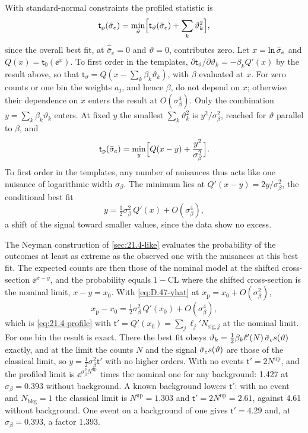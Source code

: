 With standard-normal constraints the profiled statistic is
\begin{equation*}
  \mathsf{t}_{\mathrm{p}}(\bar{\sigma}_{e}) = \min_\vartheta\Bigl[\mathsf{t}_\vartheta(\bar{\sigma}_{e}) + \sum_k\vartheta_k^2\Bigr] ,
\end{equation*}
since the overall best fit, at $\hat{\bar\sigma}_e = 0$ and $\vartheta = 0$, contributes zero. Let $x = \ln\bar{\sigma}_{e}$ and $Q(x) = \mathsf{t}_0(\ee^x)$. To first order in the templates, $\partial\mathsf{t}_\vartheta/\partial\vartheta_k = -\beta_kQ'(x)$ by the result above, so that $\mathsf{t}_\vartheta = Q(x - \sum_k\beta_k\vartheta_k)$, with $\beta$ evaluated at $x$. For zero counts or one bin the weights $a_j$, and hence $\beta$, do not depend on $x$; otherwise their dependence on $x$ enters the result at $O(\sigma_\beta^4)$. Only the combination $y = \sum_k\beta_k\vartheta_k$ enters. At fixed $y$ the smallest $\sum_k\vartheta_k^2$ is $y^2/\sigma_\beta^2$, reached for $\vartheta$ parallel to $\beta$, and
\begin{equation*}
  \mathsf{t}_{\mathrm{p}}(\bar{\sigma}_{e}) = \min_y\Bigl[Q(x - y) + \frac{y^2}{\sigma_\beta^2}\Bigr] .
\end{equation*}
To first order in the templates, any number of nuisances thus acts like one nuisance of logarithmic width $\sigma_\beta$. The minimum lies at $Q'(x - y) = 2y/\sigma_\beta^2$, the conditional best fit
\begin{equation}
  y = \tfrac12\sigma_\beta^2\,Q'(x) + O(\sigma_\beta^4) ,
  \label{eq:D.47-yhat}
\end{equation}
a shift of the signal toward smaller values, since the data show no excess.

The Neyman construction of \cref{sec:21.4-like} evaluates the probability of the outcomes at least as extreme as the observed one with the nuisances at this best fit. The expected counts are then those of the nominal model at the shifted cross-section $\ee^{x - y}$, and the probability equals $1 - \mathrm{CL}$ where the shifted cross-section is the nominal limit, $x - y = x_0$. With \cref{eq:D.47-yhat} at $x_{\mathrm{p}} = x_0 + O(\sigma_\beta^2)$,
\begin{equation*}
  x_{\mathrm{p}} - x_0 = \tfrac12\sigma_\beta^2\,Q'(x_0) + O(\sigma_\beta^4) ,
\end{equation*}
which is \cref{eq:21.4-profile} with $\mathsf{t}' = Q'(x_0) = \sum_j\ell_j'N_{\mathrm{sig},j}$ at the nominal limit. For one bin the result is exact. There the best fit obeys $\vartheta_k = \tfrac12\beta_k\ell'(N)\,\bar{\sigma}_{e} s(\vartheta)$ exactly, and at the limit the counts $N$ and the signal $\bar{\sigma}_{e} s(\vartheta)$ are those of the classical limit, so $y = \tfrac12\sigma_\beta^2\mathsf{t}'$ with no higher orders. With no events $\mathsf{t}' = 2N^{\mathrm{up}}$, and the profiled limit is $\ee^{\sigma_\beta^2N^{\mathrm{up}}}$ times the nominal one for any background: 1.427 at $\sigma_\beta = 0.393$ without background. A known background lowers $\mathsf{t}'$: with no event and $N_{\mathrm{bkg}} = 1$ the classical limit is $N^{\mathrm{up}} = 1.303$ and $\mathsf{t}' = 2N^{\mathrm{up}} = 2.61$, against 4.61 without background. One event on a background of one gives $\mathsf{t}' = 4.29$ and, at $\sigma_\beta = 0.393$, a factor 1.393.

